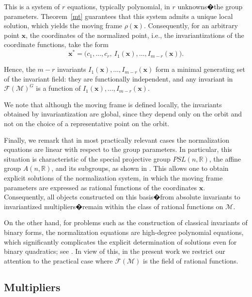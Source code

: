 \documentclass[12pt,reqno]{amsart}
\begin{document}
This is a system of $r$ equations, typically polynomial, in $r$ unknowns�the group parameters.
Theorem~\ref{mt} guarantees that this system admits a unique local solution, which yields the
moving frame $\rho(\boldsymbol x)$. Consequently, for an arbitrary point $\boldsymbol x$,
the coordinates of the normalized point, i.e., the invariantizations of the coordinate functions,
take the form
$$
\boldsymbol{x}^* = \big(c_1, \dots, c_r,\ I_1(\boldsymbol{x}), \dots, I_{m - r}(\boldsymbol{x})\big).
$$

Hence, the $m-r$ invariants $I_1(\boldsymbol{x}), \ldots, I_{m-r}(\boldsymbol{x})$ form a minimal
generating set of the invariant field: they are functionally independent, and any invariant
in $\mathcal{F}(\mathcal M)^G$ is a function of
$I_1(\boldsymbol{x}), \ldots, I_{m-r}(\boldsymbol{x})$.

We note that although the moving frame is defined locally, the invariants obtained by
invariantization are global, since they depend only on the orbit and not on the choice of a
representative point on the orbit.

\medskip

Finally, we remark that in most practically relevant cases the normalization equations are
linear with respect to the group parameters. In particular, this situation is characteristic
of the special projective group $PSL(n,\mathbb{R})$, the affine group $A(n,\mathbb{R})$, and its
subgroups, as shown in \cite{Olver2001}. This allows one to obtain explicit solutions of the
normalization system, in which the moving frame parameters are expressed as rational functions
of the coordinates $\boldsymbol{x}$. Consequently, all objects constructed on this basis�from
absolute invariants to invariantized multipliers�remain within the class of rational functions
on $\mathcal{M}$.

On the other hand, for problems such as the construction of classical invariants of binary forms,
the normalization equations are high-degree polynomial equations, which significantly complicates
the explicit determination of solutions even for binary quadratics; see \cite{Olver1999-2}.
In view of this, in the present work we restrict our attention to the practical case where
$\mathcal{F}(\mathcal{M})$ is the field of rational functions.




\subsection{Multipliers}
\end{document}
